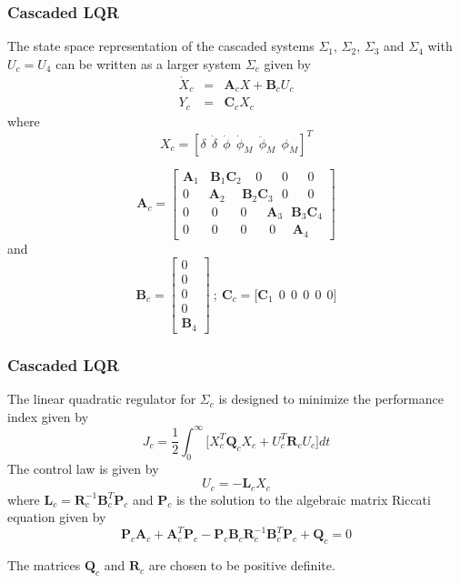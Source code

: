 \documentclass[10pt]{beamer}
\begin{document}
\begin{frame}
\frametitle{Cascaded LQR}
The state space representation of the cascaded systems $\Sigma_1$, $\Sigma_2$, $\Sigma_3$ and $\Sigma_4$ with $U_c=U_4$ can be written as a larger system $\Sigma_c$ given by
\begin{eqnarray}
\dot X_c&=&\textbf{A}_c X+\textbf{B}_c U_c\\
Y_c&=&\textbf{C}_c X_c\label{RollAPclqr14}
\end{eqnarray}
where
$$X_c=[\delta~~\dot \delta~~\dot \phi~~\dot \phi_M~~\ddot \phi_M~~\phi_M]^T$$

\begin{equation}
\textbf{A}_c=\begin{bmatrix} \textbf{A}_1~~~~\textbf{B}_1 \textbf{C}_2~~~~~0~~~~~~~0~~~~~~~0~~\\
0~~~~~~~\textbf{A}_2~~~~~~\textbf{B}_2 \textbf{C}_3~~~0~~~~~~~0~~\\
0~~~~~~~~0~~~~~~~~0~~~~~~~\textbf{A}_3~~~\textbf{B}_3 \textbf{C}_4\\
0~~~~~~~~0~~~~~~~~0~~~~~~~~0~~~~~~\textbf{A}_4~\end{bmatrix}\label{RollAPclqr15}
\end{equation}
and
\begin{equation}
\textbf{B}_c=\begin{bmatrix}0\\0\\0\\0\\\textbf{B}_4\end{bmatrix}~;~\textbf{C}_c=\bigg[ \textbf{C}_1~~0~~0~~0~~0~~0 \bigg]\label{RollAPclqr16}
\end{equation}

\vspace{.4cm}
\end{frame}
\begin{frame}
\frametitle{Cascaded LQR}
The linear quadratic regulator for $\Sigma_c$ is designed to minimize the performance index given by
\begin{equation}
J_c=\frac{1}{2} \int_0^\infty \bigg[ X_c^T\textbf{Q}_c X_c+U_c^T \textbf{R}_c U_c \bigg]dt \label{RollAPoptimal5a}
\end{equation}
The control law is given by
\begin{equation}
U_c=-\textbf{L}_c X_c\label{RollAPoptimal6a}
\end{equation}
where $\textbf{L}_c=\textbf{R}_c^{-1}\textbf{B}_c^T\textbf{P}_c$ and $\textbf{P}_c$ is the solution to the algebraic matrix Riccati equation given by
\begin{equation}
\textbf{P}_c \textbf{A}_c+\textbf{A}_c^T\textbf{P}_c-\textbf{P}_c \textbf{B}_c \textbf{R}_c^{-1}\textbf{B}_c^T\textbf{P}_c+\textbf{Q}_c=0\label{RollAPoptimal7a}
\end{equation}

The matrices $\textbf{Q}_c$ and $\textbf{R}_c$ are chosen to be positive definite.
\vspace{.4cm}
\end{frame}
\end{document}
